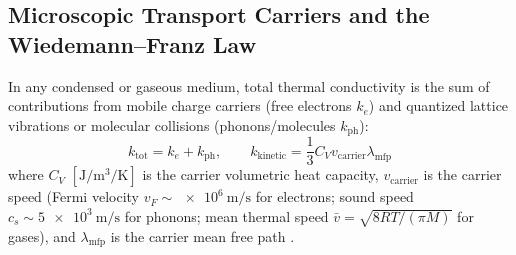 \subsection{Microscopic Transport Carriers and the Wiedemann--Franz Law}
In any condensed or gaseous medium, total thermal conductivity is the sum of contributions from mobile charge carriers (free electrons $k_e$) and quantized lattice vibrations or molecular collisions (phonons/molecules $k_{\mathrm{ph}}$):
\begin{equation}
  k_{\mathrm{tot}} = k_e + k_{\mathrm{ph}}, \qquad k_{\mathrm{kinetic}} = \frac{1}{3} C_V v_{\mathrm{carrier}} \lambda_{\mathrm{mfp}}
  \label{eq:10:carrier-sum}
\end{equation}
where $C_V$ $[\si{\joule\per\cubic\meter\per\kelvin}]$ is the carrier volumetric heat capacity, $v_{\mathrm{carrier}}$ is the carrier speed (Fermi velocity $v_F \sim \SI{e6}{\meter\per\second}$ for electrons; sound speed $c_s \sim \SI{5e3}{\meter\per\second}$ for phonons; mean thermal speed $\bar{v} = \sqrt{8RT/(\pi M)}$ for gases), and $\lambda_{\mathrm{mfp}}$ is the carrier mean free path .

